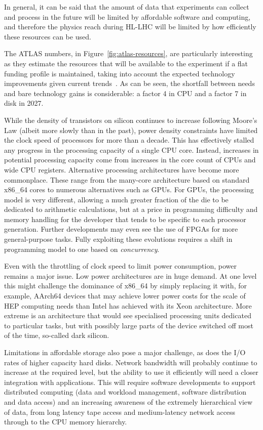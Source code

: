 \documentclass[12pt,a4paper]{article}
\begin{document}
In general, it can be said that the amount of data that experiments can
collect and process in the future will be limited by affordable software
and computing, and therefore the physics reach during HL-LHC will be
limited by how efficiently these resources can be used.

The ATLAS numbers, in Figure~\ref{fig:atlas-resources}, are particularly interesting as they
estimate the resources that will be available to the experiment if a
flat funding profile is maintained, taking into account the expected
technology improvements given current trends~\cite{Panzer2017}. As can be
seen, the shortfall between needs and bare technology gains is
considerable: a factor 4 in CPU and a factor 7 in disk in 2027.

While the density of transistors on silicon continues to increase
following Moore's Law (albeit more slowly than in the past), power
density constraints have limited the clock speed of processors for more
than a decade. This has effectively stalled any progress in the
processing capacity of a single CPU core. Instead, increases in
potential processing capacity come from increases in the core count of
CPUs and wide CPU registers. Alternative processing architectures have
become more commonplace. These range from the many-core architecture
based on standard x86\_64 cores to numerous alternatives such as GPUs.
For GPUs, the processing model is very different, allowing a much
greater fraction of the die to be dedicated to arithmetic calculations,
but at a price in programming difficulty and memory handling for the
developer that tends to be specific to each processor generation.
Further developments may even see the use of FPGAs for more
general-purpose tasks. Fully exploiting these evolutions requires a
shift in programming model to one based on \emph{concurrency}.

Even with the throttling of clock speed to limit power consumption,
power remains a major issue. Low power architectures are in huge demand.
At one level this might challenge the dominance of x86\_64 by simply
replacing it with, for example, AArch64 devices that may achieve lower power
costs for the scale of HEP computing needs than Intel has achieved with its
Xeon architecture. More extreme is an architecture that would see
specialised processing units dedicated to particular tasks, but with
possibly large parts of the device switched off most of the time,
so-called dark silicon.

Limitations in affordable storage also pose a major challenge, as does
the I/O rates of higher capacity hard disks. Network
bandwidth will probably continue to increase at the required level, but
the ability to use it efficiently will need a closer integration with
applications. This will require software developments to
support distributed computing (data and workload management, software
distribution and data access) and an increasing awareness of the
extremely hierarchical view of data, from long latency tape access and
medium-latency network access through to the CPU memory hierarchy.
\end{document}
